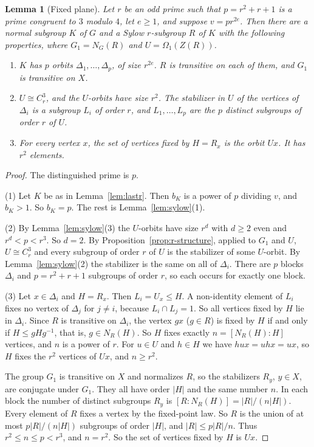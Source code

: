 \documentclass[11pt]{amsart}
\newtheorem{lemma}[theorem]{Lemma}
\theoremstyle{definition}
\theoremstyle{remark}
\begin{document}
\begin{lemma}[Fixed plane]\label{lem:fixedplane}
Let $r$ be an odd prime such that $p=r^2+r+1$ is a prime congruent to $3$ modulo $4$, let $e\ge1$, and suppose $v=pr^{2e}$. Then there are a normal subgroup $K$ of $G$ and a Sylow $r$-subgroup $R$ of $K$ with the following properties, where $G_1=N_G(R)$ and $U=\Omega_1(Z(R))$.
\begin{enumerate}
\item $K$ has $p$ orbits $\Delta_1,\dots,\Delta_p$, of size $r^{2e}$. $R$ is transitive on each of them, and $G_1$ is transitive on $X$.
\item $U\cong C_r^3$, and the $U$-orbits have size $r^2$. The stabilizer in $U$ of the vertices of $\Delta_i$ is a subgroup $L_i$ of order $r$, and $L_1,\dots,L_p$ are the $p$ distinct subgroups of order $r$ of $U$.
\item For every vertex $x$, the set of vertices fixed by $H=R_x$ is the orbit $Ux$. It has $r^2$ elements.
\end{enumerate}
\end{lemma}
\begin{proof}
The distinguished prime is $p$.

(1) Let $K$ be as in Lemma~\ref{lem:lastr}. Then $b_K$ is a power of $p$ dividing $v$, and $b_K>1$. So $b_K=p$. The rest is Lemma~\ref{lem:sylow}(1).

(2) By Lemma~\ref{lem:sylow}(3) the $U$-orbits have size $r^d$ with $d\ge2$ even and $r^d<p<r^3$. So $d=2$. By Proposition~\ref{prop:r-structure}, applied to $G_1$ and $U$, $U\cong C_r^3$ and every subgroup of order $r$ of $U$ is the stabilizer of some $U$-orbit. By Lemma~\ref{lem:sylow}(2) the stabilizer is the same on all of $\Delta_i$. There are $p$ blocks $\Delta_i$ and $p=r^2+r+1$ subgroups of order $r$, so each occurs for exactly one block.

(3) Let $x\in\Delta_i$ and $H=R_x$. Then $L_i=U_x\le H$. A non-identity element of $L_i$ fixes no vertex of $\Delta_j$ for $j\ne i$, because $L_i\cap L_j=1$. So all vertices fixed by $H$ lie in $\Delta_i$. Since $R$ is transitive on $\Delta_i$, the vertex $gx$ ($g\in R$) is fixed by $H$ if and only if $H\le gHg^{-1}$, that is, $g\in N_R(H)$. So $H$ fixes exactly $n=[N_R(H):H]$ vertices, and $n$ is a power of $r$. For $u\in U$ and $h\in H$ we have $hux=uhx=ux$, so $H$ fixes the $r^2$ vertices of $Ux$, and $n\ge r^2$.

The group $G_1$ is transitive on $X$ and normalizes $R$, so the stabilizers $R_y$, $y\in X$, are conjugate under $G_1$. They all have order $|H|$ and the same number $n$. In each block the number of distinct subgroups $R_y$ is $[R:N_R(H)]=|R|/(n|H|)$. Every element of $R$ fixes a vertex by the fixed-point law. So $R$ is the union of at most $p|R|/(n|H|)$ subgroups of order $|H|$, and $|R|\le p|R|/n$. Thus $r^2\le n\le p<r^3$, and $n=r^2$. So the set of vertices fixed by $H$ is $Ux$.
\end{proof}
\end{document}
